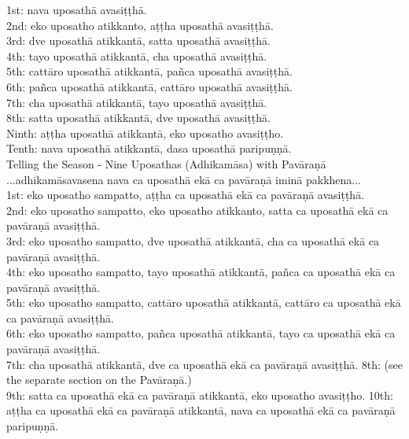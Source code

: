 1st: nava uposathā avasiṭṭhā.\\
2nd: eko uposatho atikkanto, aṭṭha uposathā avasiṭṭhā.\\
3rd: dve uposathā atikkantā, satta uposathā avasiṭṭhā.\\
4th: tayo uposathā atikkantā, cha uposathā avasiṭṭhā.\\
5th: cattāro uposathā atikkantā, pañca uposathā avasiṭṭhā.\\
6th: pañca uposathā atikkantā, cattāro uposathā avasiṭṭhā.\\
7th: cha uposathā atikkantā, tayo uposathā avasiṭṭhā.\\
8th: satta uposathā atikkantā, dve uposathā avasiṭṭhā.\\
Ninth: aṭṭha uposathā atikkantā, eko uposatho avasiṭṭho.\\
Tenth: nava uposathā atikkantā, dasa uposathā paripuṇṇā.\\

Telling the Season - Nine Uposathas (Adhikamāsa) with Pavāraṇā\\

...adhikamāsavasena nava ca uposathā ekā ca pavāraṇā iminā pakkhena...\\

1st: eko uposatho sampatto, aṭṭha ca uposathā ekā ca pavāraṇā avasiṭṭhā.\\
2nd: eko uposatho sampatto, eko uposatho atikkanto, satta ca uposathā ekā ca pavāraṇā avasiṭṭhā.\\
3rd: eko uposatho sampatto, dve uposathā atikkantā, cha ca uposathā ekā ca pavāraṇā avasiṭṭhā.\\
4th: eko uposatho sampatto, tayo uposathā atikkantā, pañca ca uposathā ekā ca pavāraṇā avasiṭṭhā.\\
5th:  eko uposatho sampatto, cattāro uposathā atikkantā, cattāro ca uposathā ekā ca pavāraṇā avasiṭṭhā.\\
6th:  eko uposatho sampatto, pañca uposathā atikkantā, tayo ca uposathā ekā ca pavāraṇā avasiṭṭhā.\\
7th: cha uposathā atikkantā, dve ca uposathā ekā ca pavāraṇā avasiṭṭhā.
8th: (see the separate section on the Pavāraṇā.)\\
9th: satta ca uposathā ekā ca pavāraṇā atikkantā, eko uposatho avasiṭṭho.
10th: aṭṭha ca uposathā ekā ca pavāraṇā atikkantā, nava ca uposathā ekā ca pavāraṇā paripuṇṇā.\\